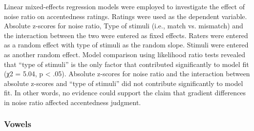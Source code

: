 Linear mixed-effects regression models were employed to investigate the effect of noise ratio on accentedness ratings. Ratings were used as the dependent variable. Absolute z-scores for noise ratio, Type of stimuli (i.e., match vs. mismatch) and the interaction between the two were entered as fixed effects. Raters were entered as a random effect with type of stimuli as the random slope. Stimuli were entered as another random effect. Model comparison using likelihood ratio tests revealed that “type of stimuli” is the only factor that contributed significantly to model fit (χ2 = 5.04, p < .05). Absolute z-scores for noise ratio and the interaction between absolute z-scores and  “type of stimuli” did not contribute significantly to model fit. In other words, no evidence could support the claim that gradient differences in noise ratio affected accentedness judgment. 

\subsubsection{Vowels}

